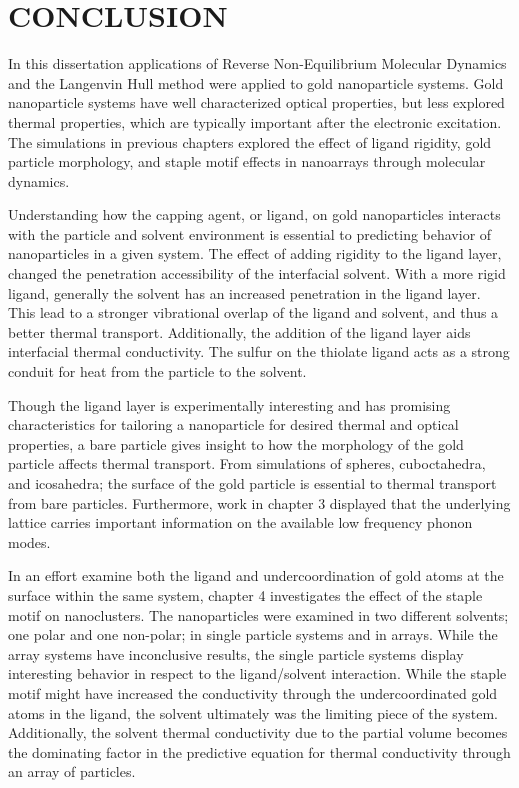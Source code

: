 \chapter{CONCLUSION}\label{chap:conclusion}
In this dissertation applications of Reverse Non-Equilibrium Molecular Dynamics and the Langenvin Hull method were applied to gold nanoparticle systems. Gold nanoparticle systems have well characterized optical properties, but less explored thermal properties, which are typically important after the electronic excitation. The simulations in previous chapters explored the effect of ligand rigidity, gold particle morphology, and staple motif effects in nanoarrays through molecular dynamics.

Understanding how the capping agent, or ligand, on gold nanoparticles interacts with the particle and solvent environment is essential to predicting behavior of nanoparticles in a given system. The effect of adding rigidity to the ligand layer, changed the penetration accessibility of the interfacial solvent. With a more rigid ligand, generally the solvent has an increased penetration in the ligand layer. This lead to a stronger vibrational overlap of the ligand and solvent, and thus a better thermal transport. Additionally, the addition of the ligand layer aids interfacial thermal conductivity. The sulfur on the thiolate ligand acts as a strong conduit for heat from the particle to the solvent.

Though the ligand layer is experimentally interesting and has promising characteristics for tailoring a nanoparticle for desired thermal and optical properties, a bare particle gives insight to how the morphology of the gold particle affects thermal transport.
From simulations of spheres, cuboctahedra, and icosahedra; the surface of the gold particle is essential to thermal transport from bare particles.
Furthermore, work in chapter 3 displayed that the underlying lattice carries important information on the available low frequency phonon modes. 

In an effort examine both the ligand and undercoordination of gold atoms at the surface within the same system, chapter 4 investigates the effect of the staple motif on  nanoclusters.
The nanoparticles were examined in two different solvents; one polar and one non-polar; in single particle systems and in arrays.
While the array systems have inconclusive results, the single particle systems display interesting behavior in respect to the ligand/solvent interaction. 
While the staple motif might have increased the conductivity through the undercoordinated gold atoms in the ligand, the solvent ultimately was the limiting piece of the system. 
Additionally, the solvent thermal conductivity due to the partial volume becomes the dominating factor in the predictive equation for thermal conductivity through an array of  particles.

